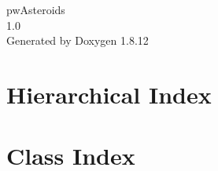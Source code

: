 \documentclass[twoside]{book}
\newcommand{\+}{\discretionary{\mbox{\scriptsize$\hookleftarrow$}}{}{}}
\newcommand{\clearemptydoublepage}{%
  \newpage{\pagestyle{empty}\cleardoublepage}%
}
\begin{document}
\hypersetup{pageanchor=false,
             bookmarksnumbered=true,
             pdfencoding=unicode
            }
\begin{titlepage}
\vspace*{7cm}
\begin{center}%
{\Large pw\+Asteroids \\[1ex]\large 1.\+0 }\\
\vspace*{1cm}
{\large Generated by Doxygen 1.8.12}\\
\end{center}
\end{titlepage}
\clearemptydoublepage
{}
\tableofcontents
\clearemptydoublepage
{}
\hypersetup{pageanchor=true}

\chapter{Hierarchical Index}

\chapter{Class Index}

\end{document}
